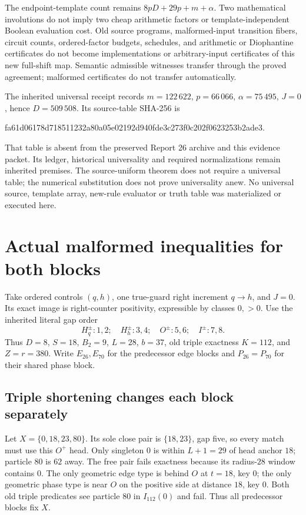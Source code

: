 \documentclass[11pt,a4paper]{article}
\numberwithin{equation}{section}
\begin{document}
The endpoint-template count remains $8pD+29p+m+\alpha$. Two mathematical involutions do not imply two cheap arithmetic factors or template-independent Boolean evaluation cost. Old source programs, malformed-input transition fibers, circuit counts, ordered-factor budgets, schedules, and arithmetic or Diophantine certificates do not become implementations or arbitrary-input certificates of this new full-shift map. Semantic admissible witnesses transfer through the proved agreement; malformed certificates do not transfer automatically.

The inherited universal receipt records $m=122\,622$, $p=66\,066$, $\alpha=75\,495$, $J=0$, hence $D=509\,508$. Its source-table SHA-256 is
\begin{center}\footnotesize\ttfamily
fa61d06178d718511232a80a05e02192d940fde3c273f0c202f0623253b2ade3.
\end{center}
That table is absent from the preserved Report 26 archive and this evidence packet. Its ledger, historical universality and required normalizations remain inherited premises. The source-uniform theorem does not require a universal table; the numerical substitution does not prove universality anew. No universal source, template array, new-rule evaluator or truth table was materialized or executed here.

\section{Actual malformed inequalities for both blocks}\label{fpa:sw:sec:malformed}
Take ordered controls $(q,h)$, one true-guard right increment $q\to h$, and $J=0$. Its exact image is right-counter positivity, expressible by classes $0,>0$. Use the inherited literal gap order
\[
H_q^\pm:1,2;\quad H_h^\pm:3,4;\quad O^\pm:5,6;\quad I^\pm:7,8.
\]
Thus $D=8$, $S=18$, $B_2=9$, $L=28$, $b=37$, old triple exactness $K=112$, and $Z=r=380$. Write $E_{26},E_{70}$ for the predecessor edge blocks and $P_{26}=P_{70}$ for their shared phase block.

\subsection{Triple shortening changes each block separately}
Let $X=\{0,18,23,80\}$. Its sole close pair is $\{18,23\}$, gap five, so every match must use this $O^+$ head. Only singleton $0$ is within $L+1=29$ of head anchor $18$; particle $80$ is $62$ away. The free pair fails exactness because its radius-$28$ window contains $0$. The only geometric edge type is behind $O$ at $t=18$, key $0$; the only geometric phase type is near $O$ on the positive side at distance $18$, key $0$. Both old triple predicates see particle $80$ in $I_{112}(0)$ and fail. Thus all predecessor blocks fix $X$.
\end{document}
